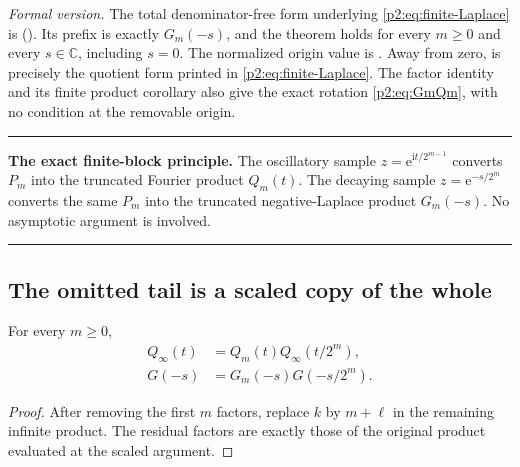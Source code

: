 \documentclass[11pt,oneside]{article}
\numberwithin{equation}{section}
\theoremstyle{definition}
\theoremstyle{remark}
\newcommand{\C}{\mathbb C}
\newcommand{\e}{\mathrm e}
\newcommand{\ii}{\mathrm i}
\newenvironment{boxedremark}{%
  \par\smallskip\noindent\begin{center}\begin{minipage}{0.94\textwidth}%
  \color{black}\hrule\vspace{0.6em}\small
}{%
  \vspace{0.6em}\hrule\end{minipage}\end{center}\smallskip
}
\begin{document}
\emph{Formal version.}  The total denominator-free form underlying
\eqref{p2:eq:finite-Laplace} is
().  Its prefix
 is exactly $G_m(-s)$, and the theorem
holds for every $m\ge0$ and every $s\in\C$, including $s=0$.
The normalized origin value is
.  Away from zero,
 is precisely
the quotient form printed in \eqref{p2:eq:finite-Laplace}.  The factor identity
 and its finite
product corollary
also give the exact rotation \eqref{p2:eq:GmQm}, with no condition at the
removable origin.

\begin{boxedremark}
\textbf{The exact finite-block principle.}
The oscillatory sample $z=\e^{\ii t/2^{m-1}}$ converts $P_m$ into the truncated Fourier
product $Q_m(t)$.  The decaying sample $z=\e^{-s/2^m}$ converts the same $P_m$ into the
truncated negative-Laplace product $G_m(-s)$.  No asymptotic argument is involved.
\end{boxedremark}

\subsection{The omitted tail is a scaled copy of the whole}

\begin{proposition}
\label{p2:prop:tail-self}
For every $m\ge0$,
\begin{align}
 Q_\infty(t)&=Q_m(t)Q_\infty(t/2^m),
 \label{p2:eq:Q-tail-self}\\
 G(-s)&=G_m(-s)G(-s/2^m).
 \label{p2:eq:G-tail-self}
\end{align}
\newresult
\end{proposition}

\begin{proof}
After removing the first $m$ factors, replace $k$ by $m+\ell$ in the remaining infinite
product.  The residual factors are exactly those of the original product evaluated at the
scaled argument.
\end{proof}
\end{document}
